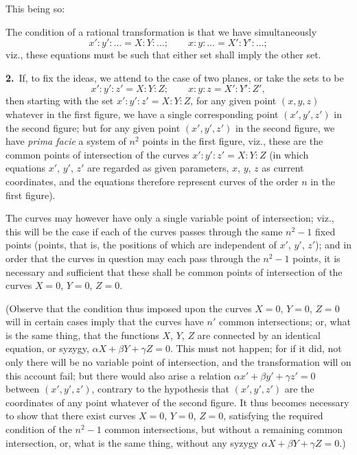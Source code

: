 \documentclass[11pt,a4paper]{article}
\begin{document}
This being so:

The condition of a rational transformation is that we have simultaneously
\[
x' : y' : \ldots = X : Y : \ldots;\qquad x : y : \ldots = X' : Y' : \ldots;
\]
viz., these equations must be such that either set shall imply the other set.

\textbf{2.}\ If, to fix the ideas, we attend to the case of two planes, or take the sets to be
\[
x' : y' : z' = X : Y : Z;\qquad x : y : z = X' : Y' : Z',
\]
then starting with the set $x' : y' : z' = X : Y : Z$, for any given point $(x, y, z)$ whatever in the first figure, we have a single corresponding point $(x', y', z')$ in the second figure; but for any given point $(x', y', z')$ in the second figure, we have \textit{prima facie} a system of $n^2$ points in the first figure, viz., these are the common points of intersection of the curves $x' : y' : z' = X : Y : Z$ (in which equations $x'$, $y'$, $z'$ are regarded as given parameters, $x$, $y$, $z$ as current coordinates, and the equations therefore represent curves of the order $n$ in the first figure).

\newpage
\setcounter{page}{191}

\noindent The curves may however have only a single variable point of intersection; viz., this will be the case if each of the curves passes through the same $n^2 - 1$ fixed points (points, that is, the positions of which are independent of $x'$, $y'$, $z'$); and in order that the curves in question may each pass through the $n^2 - 1$ points, it is necessary and sufficient that these shall be common points of intersection of the curves $X = 0$, $Y = 0$, $Z = 0$.

(Observe that the condition thus imposed upon the curves $X = 0$, $Y = 0$, $Z = 0$ will in certain cases imply that the curves have $n'$ common intersections; or, what is the same thing, that the functions $X$, $Y$, $Z$ are connected by an identical equation, or syzygy, $\alpha X + \beta Y + \gamma Z = 0$. This must not happen; for if it did, not only there will be no variable point of intersection, and the transformation will on this account fail; but there would also arise a relation $\alpha x' + \beta y' + \gamma z' = 0$ between $(x', y', z')$, contrary to the hypothesis that $(x', y', z')$ are the coordinates of any point whatever of the second figure. It thus becomes necessary to show that there exist curves $X = 0$, $Y = 0$, $Z = 0$, satisfying the required condition of the $n^2 - 1$ common intersections, but without a remaining common intersection, or, what is the same thing, without any syzygy $\alpha X + \beta Y + \gamma Z = 0$.)
\end{document}
